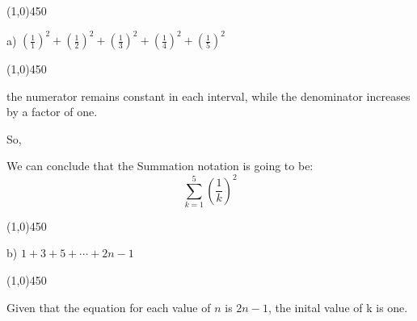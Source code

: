 \documentclass{report}
\begin{document}
\line(1,0){450}

\begin{center}
\begin{large}
a) $\left(\frac{1}{1}\right)^2+\left(\frac{1}{2}\right)^2+\left(\frac{1}{3}\right)^2+\left(\frac{1}{4}\right)^2+\left(\frac{1}{5}\right)^2$
\end{large}
\end{center}

\line(1,0){450}

\begin{center}
  the numerator remains constant in each interval, while the denominator increases by a factor of one.
\end{center}

So,
\vspace{4mm}

We can conclude that the Summation notation is going to be:
$$\sum_{k=1}^5\left(\frac{1}{k}\right)^2$$ 
\bigbreak \noindent \bigbreak \noindent

\line(1,0){450}
\vspace{2mm}

\begin{center}
\begin{large}
b) $1+3+5+\cdots+2 n-1$
\end{large}
\end{center}

\line(1,0){450}
\vspace{2mm}

\begin{center}
 Given that the equation for each value of $n$ is $2n-1$, the inital value of k is one.
\end{center}

\vspace{2mm}
\end{document}
